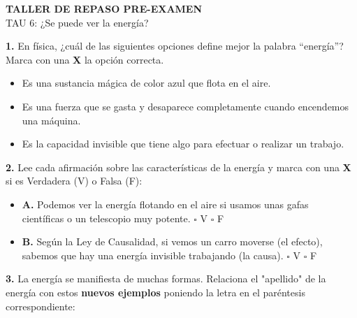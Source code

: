 \documentclass[12pt, letterpaper]{article}
\newif\ifshowanswers
\newcommand{\casillaVerdadera}{\ifshowanswers \textcolor{blue}{$\blacksquare$} \else $\square$ \fi}
\newcommand{\casillaFalsa}{\ifshowanswers $\square$ \else $\square$ \fi}
\begin{document}
	
	\begin{center} 
		\textbf{TALLER DE REPASO PRE-EXAMEN}\\[0.1cm] 
		TAU 6: ¿Se puede ver la energía? 
	\end{center}
	
	\noindent \textbf{1.} En física, ¿cuál de las siguientes opciones define mejor la palabra ``energía''? Marca con una \textbf{X} la opción correcta. 
	
	\vspace{0.3cm} 
	\begin{itemize}[itemsep=0.4cm] 
		\item[ \casillaFalsa ] Es una sustancia mágica de color azul que flota en el aire. 
		\item[ \casillaFalsa ] Es una fuerza que se gasta y desaparece completamente cuando encendemos una máquina.
		\item[ \casillaVerdadera ] Es la capacidad invisible que tiene algo para efectuar o realizar un trabajo. 
	\end{itemize}
	
	\vspace{0.5cm}
	
	\noindent \textbf{2.} Lee cada afirmación sobre las características de la energía y marca con una \textbf{X} si es Verdadera (V) o Falsa (F): 
	
	\vspace{0.3cm} 
	\begin{itemize}[itemsep=0.6cm, label={}] 
		\item \textbf{A.} Podemos ver la energía flotando en el aire si usamos unas gafas \\ científicas o un telescopio muy potente. \hfill  \casillaFalsa  V \quad  \casillaVerdadera  F 
		\item \textbf{B.} Según la Ley de Causalidad, si vemos un carro moverse (el efecto),\\ sabemos que hay una energía invisible trabajando (la causa). \hfill  \casillaVerdadera  V \quad  \casillaFalsa  F 
	\end{itemize}
	
	\vspace{0.5cm}
	
	\noindent \textbf{3.} La energía se manifiesta de muchas formas. Relaciona el "apellido" de la energía con estos \textbf{nuevos ejemplos} poniendo la letra en el paréntesis correspondiente: 
	
\end{document}
